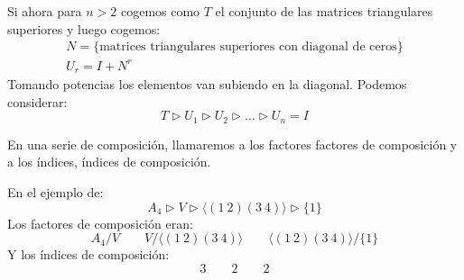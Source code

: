 \begin{ejemplo}
    \noindent
    Si ahora para $n>2$ cogemos como $T$ el conjunto de las matrices triangulares superiores y luego cogemos:
    \begin{gather*}
        N = \{\text{matrices triangulares superiores con diagonal de ceros}\} \\
        U_r = I + N^r
    \end{gather*}
    Tomando potencias los elementos van subiendo en la diagonal. Podemos considerar:
    \begin{equation*}
        T \rhd U_1 \rhd U_2 \rhd \ldots \rhd U_n = I
    \end{equation*}
\end{ejemplo}

\begin{definicion}
    En una serie de composición, llamaremos a los factores factores de composición y a los índices, índices de composición.
\end{definicion}

\begin{ejemplo}
    En el ejemplo de:
    \begin{equation*}
        A_4 \rhd V \rhd \langle (1\ 2)(3\ 4) \rangle  \rhd \{1\}
    \end{equation*}
    Los factores de composición eran:
    \begin{equation*}
        A_4/V \qquad V/\langle (1\ 2)(3\ 4) \rangle \qquad \langle (1\ 2)(3\ 4) \rangle /\{1\}
    \end{equation*}
    Y los índices de composición:
    \begin{equation*}
        3 \qquad 2 \qquad 2
    \end{equation*}
\end{ejemplo}

